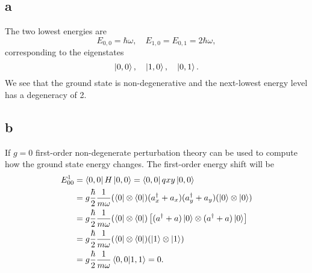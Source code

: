 \documentclass[11pt]{amsart}
\begin{document}
\subsection*{a}
The two lowest energies are
\begin{equation*}
E_{0,0} = \hbar\omega, \quad E_{1,0}=E_{0,1} = 2\hbar\omega,
\end{equation*}
corresponding to the eigenstates
\begin{equation*}
\ket{0,0}, \quad \ket{1,0}, \quad \ket{0,1}.
\end{equation*}
We see that the ground state is non-degenerative and the next-lowest energy level has a degeneracy of 2.

\subsection*{b}
If $g=0$ first-order non-degenerate perturbation theory can be used to compute how the ground state energy changes. The first-order energy shift will be
\begin{align*}
E_{00}^1 	&= \bra{0,0}H\ket{0,0} = \bra{0,0}qxy\ket{0,0} \\
			&=  g\frac{\hbar}{2}\frac{1}{m\omega}(\bra{0}\otimes\bra{0})(a_x^{\dagger}+a_x)(a_y^{\dagger}+a_y)(\ket{0}\otimes\ket{0}) \\
			&=  g\frac{\hbar}{2}\frac{1}{m\omega}(\bra{0}\otimes\bra{0})\left[(a^{\dagger}+a)\ket{0}\otimes(a^{\dagger}+a)\ket{0}\right] \\
			&= g\frac{\hbar}{2}\frac{1}{m\omega}(\bra{0}\otimes\bra{0})(\ket{1}\otimes\ket{1}) \\
			&= g\frac{\hbar}{2}\frac{1}{m\omega}\braket{0,0}{1,1} = 0.
\end{align*}
\end{document}
